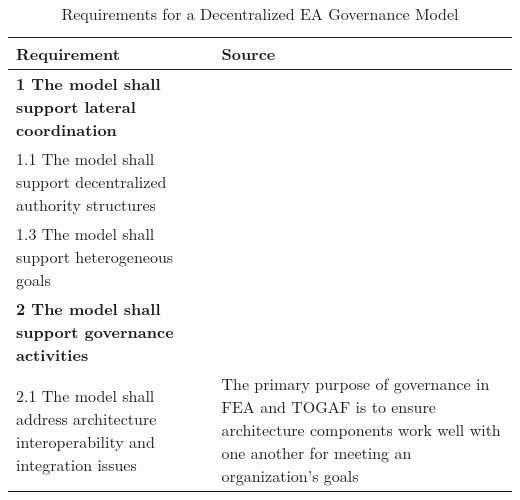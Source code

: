 \begin{table}
\caption{Requirements for a Decentralized EA Governance Model}
\label{table:requirements}
\begin{tabular}{ | p{} | p{} |}
%
\hline
%
\textbf{Requirement} & 
\textbf{Source}  \\
%
\hline
%
\textbf{1 The model shall support lateral coordination} & \\
%
%
1.1 The model shall support decentralized authority structures & 
\cite{Weill2004,pearlson2009,robbins1997,Camarinha-Matos2005} \\
%
%
%
1.3 The model shall support heterogeneous goals & 
\cite{Camarinha-Matos2005} \\
%
%
%
\hline
%
\textbf{2 The model shall support governance activities}  & 
 \\


2.1 The model shall address architecture interoperability and integration issues &
The primary purpose of governance in FEA \cite[Sec. 2]{FEA_PMO2007} and TOGAF \cite[Ch. 50]{togaf9.1} is to ensure architecture components work well with one another for meeting an organization's goals \\

\hline
%
\end{tabular}
\end{table}

 
